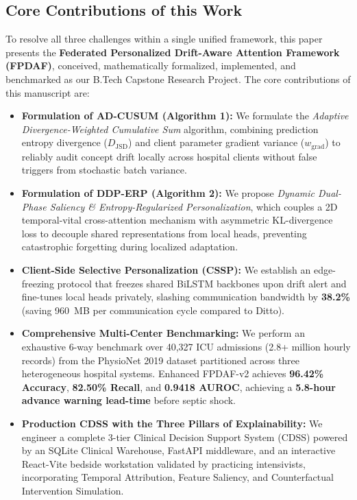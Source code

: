\documentclass[journal,twocolumn,10pt]{IEEEtran}
\begin{document}
\subsection{Core Contributions of this Work}
To resolve all three challenges within a single unified framework, this paper presents the \textbf{Federated Personalized Drift-Aware Attention Framework (FPDAF)}, conceived, mathematically formalized, implemented, and benchmarked as our B.Tech Capstone Research Project. The core contributions of this manuscript are:
\begin{itemize}
    \item \textbf{Formulation of AD-CUSUM (Algorithm 1):} We formulate the \textit{Adaptive Divergence-Weighted Cumulative Sum} algorithm, combining prediction entropy divergence ($D_{\text{JSD}}$) and client parameter gradient variance ($w_{\text{grad}}$) to reliably audit concept drift locally across hospital clients without false triggers from stochastic batch variance.
    \item \textbf{Formulation of DDP-ERP (Algorithm 2):} We propose \textit{Dynamic Dual-Phase Saliency \& Entropy-Regularized Personalization}, which couples a 2D temporal-vital cross-attention mechanism with asymmetric KL-divergence loss to decouple shared representations from local heads, preventing catastrophic forgetting during localized adaptation.
    \item \textbf{Client-Side Selective Personalization (CSSP):} We establish an edge-freezing protocol that freezes shared BiLSTM backbones upon drift alert and fine-tunes local heads privately, slashing communication bandwidth by \textbf{38.2\%} (saving 960~MB per communication cycle compared to Ditto).
    \item \textbf{Comprehensive Multi-Center Benchmarking:} We perform an exhaustive 6-way benchmark over 40,327 ICU admissions (2.8+ million hourly records) from the PhysioNet 2019 dataset partitioned across three heterogeneous hospital systems. Enhanced FPDAF-v2 achieves \textbf{96.42\% Accuracy}, \textbf{82.50\% Recall}, and \textbf{0.9418 AUROC}, achieving a \textbf{5.8-hour advance warning lead-time} before septic shock.
    \item \textbf{Production CDSS with the Three Pillars of Explainability:} We engineer a complete 3-tier Clinical Decision Support System (CDSS) powered by an SQLite Clinical Warehouse, FastAPI middleware, and an interactive React-Vite bedside workstation validated by practicing intensivists, incorporating Temporal Attribution, Feature Saliency, and Counterfactual Intervention Simulation.
\end{itemize}
\end{document}
